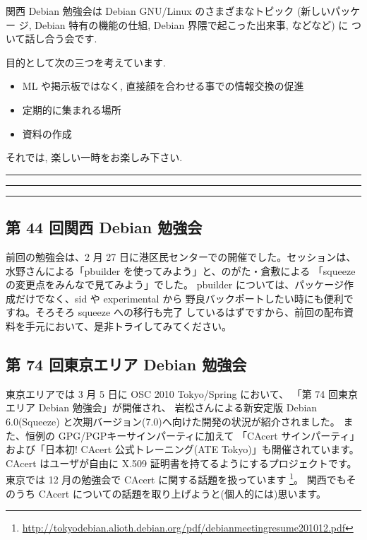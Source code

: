 \documentclass[mingoth,a4paper]{jsarticle}
\begin{document}
関西 Debian 勉強会は Debian GNU/Linux のさまざまなトピック (新しいパッケー
ジ, Debian 特有の機能の仕組, Debian 界隈で起こった出来事, などなど) に
ついて話し合う会です.

目的として次の三つを考えています.
\begin{itemize}
      \item ML や掲示板ではなく, 直接顔を合わせる事での情報交換の促進
      \item 定期的に集まれる場所
      \item 資料の作成
\end{itemize}

それでは, 楽しい一時をお楽しみ下さい.

\clearpage

\begin{minipage}[b]{0.2\hsize}
 {}
\end{minipage}
\begin{minipage}[b]{0.8\hsize}
\hrule
\vspace{2mm}
\hrule
\setcounter{tocdepth}{1}
\tableofcontents
\vspace{2mm}
\hrule
\end{minipage}


\subsection{第 44 回関西 Debian 勉強会}
前回の勉強会は、2 月 27 日に港区民センターでの開催でした。セッションは、
水野さんによる「pbuilder を使ってみよう」と、のがた・倉敷による
「squeeze の変更点をみんなで見てみよう」でした。
pbuilder については、パッケージ作成だけでなく、sid や experimental から
野良バックポートしたい時にも便利ですね。そろそろ squeeze への移行も完了
しているはずですから、前回の配布資料を手元において、是非トライしてみてください。

\subsection{第 74 回東京エリア Debian 勉強会}

東京エリアでは 3 月 5 日に OSC 2010 Tokyo/Spring において、
「第 74 回東京エリア Debian 勉強会」が開催され、
岩松さんによる新安定版 Debian 6.0(Squeeze) と次期バージョン(7.0)へ向けた開発の状況が紹介されました。
また、恒例の GPG/PGPキーサインパーティに加えて
「CAcert サインパーティ」および「日本初! CAcert 公式トレーニング(ATE Tokyo)」も開催されています。
CAcert はユーザが自由に X.509 証明書を持てるようにするプロジェクトです。
東京では 12 月の勉強会で CAcert に関する話題を扱っています%
\footnote{\url{http://tokyodebian.alioth.debian.org/pdf/debianmeetingresume201012.pdf}}。
関西でもそのうち CAcert についての話題を取り上げようと(個人的には)思います。
\end{document}
